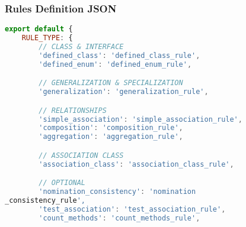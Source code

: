 \subsubsection{Rules Definition JSON}
\begin{lstlisting}[caption={Rules Definition JSON}, label={lst:rules_def}, language=javascript]
export default {
    RULE_TYPE: {
        // CLASS & INTERFACE
        'defined_class': 'defined_class_rule',
        'defined_enum': 'defined_enum_rule',

        // GENERALIZATION & SPECIALIZATION
        'generalization': 'generalization_rule',

        // RELATIONSHIPS
        'simple_association': 'simple_association_rule',
        'composition': 'composition_rule',
        'aggregation': 'aggregation_rule',

        // ASSOCIATION CLASS
        'association_class': 'association_class_rule',

        // OPTIONAL
        'nomination_consistency': 'nomination
_consistency_rule',
        'test_association': 'test_association_rule',
        'count_methods': 'count_methods_rule',


\end{lstlisting}
